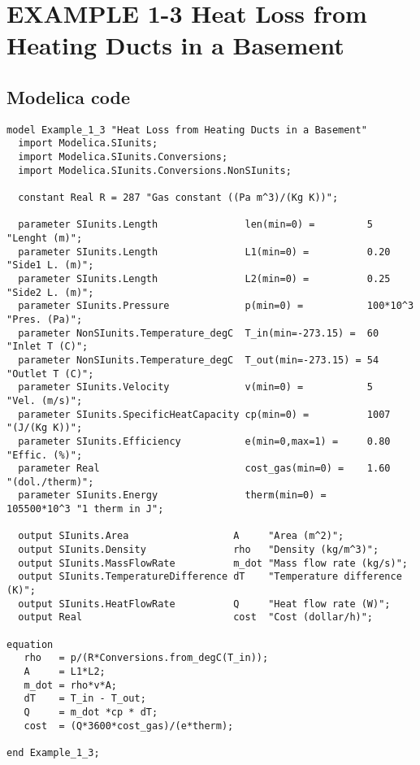 \documentclass{modelica}
\begin{document}
\thispagestyle{empty}
\date{} %

\section*{EXAMPLE 1-3 Heat Loss from Heating Ducts in a Basement}

\subsection*{Modelica code}


\begin{lstlisting}[mathescape=true] 
model Example_1_3 "Heat Loss from Heating Ducts in a Basement"
  import Modelica.SIunits;
  import Modelica.SIunits.Conversions;
  import Modelica.SIunits.Conversions.NonSIunits;

  constant Real R = 287 "Gas constant ((Pa m^3)/(Kg K))";

  parameter SIunits.Length               len(min=0) =         5           "Lenght (m)";
  parameter SIunits.Length               L1(min=0) =          0.20        "Side1 L. (m)";
  parameter SIunits.Length               L2(min=0) =          0.25        "Side2 L. (m)";
  parameter SIunits.Pressure             p(min=0) =           100*10^3    "Pres. (Pa)";
  parameter NonSIunits.Temperature_degC  T_in(min=-273.15) =  60          "Inlet T (C)";
  parameter NonSIunits.Temperature_degC  T_out(min=-273.15) = 54          "Outlet T (C)";
  parameter SIunits.Velocity             v(min=0) =           5           "Vel. (m/s)";
  parameter SIunits.SpecificHeatCapacity cp(min=0) =          1007        "(J/(Kg K))";
  parameter SIunits.Efficiency           e(min=0,max=1) =     0.80        "Effic. (%)";
  parameter Real                         cost_gas(min=0) =    1.60        "(dol./therm)";
  parameter SIunits.Energy               therm(min=0) =       105500*10^3 "1 therm in J";

  output SIunits.Area                  A     "Area (m^2)";
  output SIunits.Density               rho   "Density (kg/m^3)";
  output SIunits.MassFlowRate          m_dot "Mass flow rate (kg/s)";
  output SIunits.TemperatureDifference dT    "Temperature difference (K)";
  output SIunits.HeatFlowRate          Q     "Heat flow rate (W)";
  output Real                          cost  "Cost (dollar/h)";

equation 
   rho   = p/(R*Conversions.from_degC(T_in));
   A     = L1*L2;
   m_dot = rho*v*A;
   dT    = T_in - T_out;
   Q     = m_dot *cp * dT;
   cost  = (Q*3600*cost_gas)/(e*therm);
  
end Example_1_3;  
\end{lstlisting}
\end{document}
